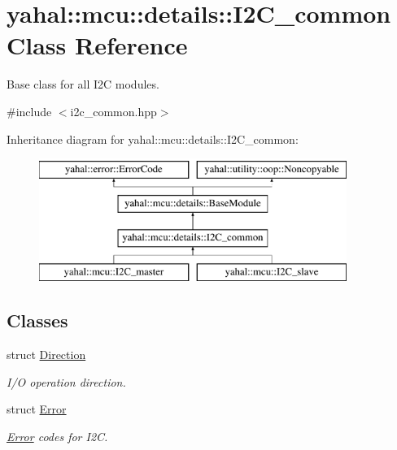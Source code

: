 \hypertarget{classyahal_1_1mcu_1_1details_1_1_i2_c__common}{}\section{yahal\+:\+:mcu\+:\+:details\+:\+:I2\+C\+\_\+common Class Reference}
\label{classyahal_1_1mcu_1_1details_1_1_i2_c__common}


Base class for all I2\+C modules.  




{\ttfamily \#include $<$i2c\+\_\+common.\+hpp$>$}

Inheritance diagram for yahal\+:\+:mcu\+:\+:details\+:\+:I2\+C\+\_\+common\+:\begin{figure}[H]
\begin{center}
\leavevmode
\includegraphics[height=4.000000cm]{classyahal_1_1mcu_1_1details_1_1_i2_c__common}
\end{center}
\end{figure}
\subsection*{Classes}
\begin{DoxyCompactItemize}
\item 
struct \hyperlink{structyahal_1_1mcu_1_1details_1_1_i2_c__common_1_1_direction}{Direction}
\begin{DoxyCompactList}\small\item\em I/\+O operation direction. \end{DoxyCompactList}\item 
struct \hyperlink{structyahal_1_1mcu_1_1details_1_1_i2_c__common_1_1_error}{Error}
\begin{DoxyCompactList}\small\item\em \hyperlink{structyahal_1_1mcu_1_1details_1_1_i2_c__common_1_1_error}{Error} codes for I2\+C. \end{DoxyCompactList}\end{DoxyCompactItemize}
